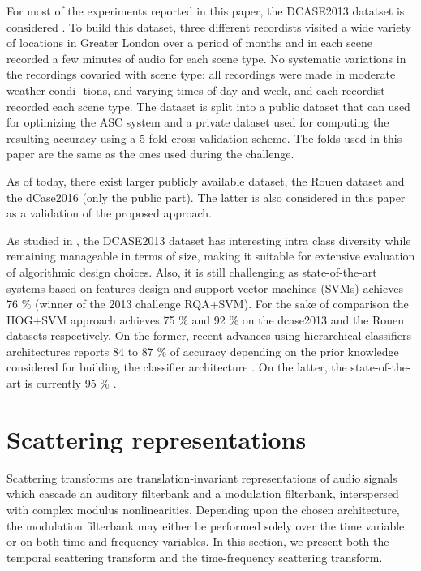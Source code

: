 \documentclass[journal]{IEEEtran}
\begin{document}

For most of the experiments reported in this paper, the DCASE2013 datatset is considered \cite{giannoulis2013database, 7100934}. To build this dataset, three different recordists visited a wide variety of locations in Greater London over
a period of months and in each
scene recorded a few minutes of audio for each scene type. No
systematic variations in the recordings covaried with scene
type: all recordings were made in moderate weather condi-
tions, and varying times of day and week, and each recordist
recorded each scene type. The dataset is split into a public dataset that can used for optimizing the ASC system and a private dataset used for computing the resulting accuracy using a 5 fold cross validation scheme. The folds used in this paper are the same as the ones used during the challenge.

As of today, there exist larger publicly available dataset, the
Rouen dataset \cite{rakotomamonjy2015histogram} and the dCase2016 \cite{Mesaros2016_EUSIPCO} (only the public part). The latter is also considered in this paper as a validation of the proposed approach.

As studied in \cite{lagrange:hal-01082501}, the DCASE2013 dataset has interesting intra class diversity while remaining manageable in terms of size, making it suitable for extensive evaluation of algorithmic design choices. Also, it is still challenging as state-of-the-art systems based on features design and support vector machines (SVMs) achieves 76 \% \cite{roma2013} (winner of the 2013 challenge RQA+SVM). For the sake of comparison the HOG+SVM approach \cite{rakotomamonjy2015histogram} achieves 75 \% and 92 \% on the dcase2013 and the Rouen datasets respectively. On the former, recent advances using hierarchical classifiers architectures reports 84 to 87 \% of accuracy depending on the prior knowledge considered for building the classifier architecture \cite{phan2016label}. On the latter, the state-of-the-art is currently 95 \% \cite{bisot2016acoustic}. 

\section{Scattering representations \label{sec:scattering}}

Scattering transforms are translation-invariant representations of audio signals which cascade an auditory filterbank and a modulation filterbank, interspersed with complex modulus nonlinearities.
Depending upon the chosen architecture, the modulation filterbank may either be performed solely over the time variable or on both time and frequency variables.
In this section, we present both the temporal scattering transform and the time-frequency scattering transform.
\end{document}
